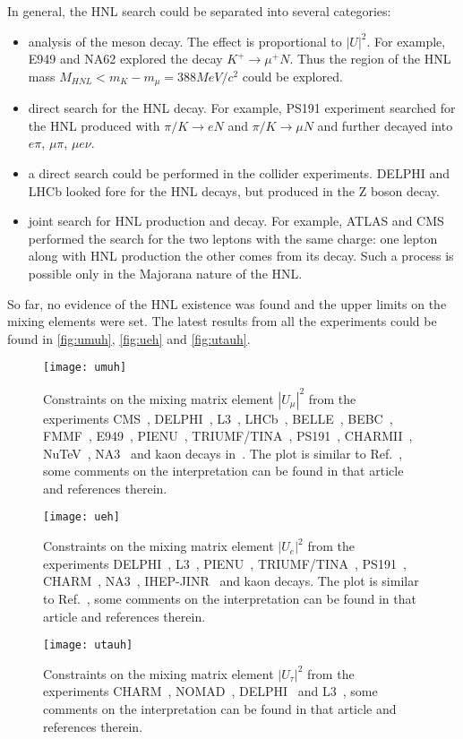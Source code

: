 \documentclass[../main.tex]{subfiles}
\begin{document}
In general, the HNL search could be separated into several categories:
\begin{itemize}
  \item analysis of the meson decay. The effect is proportional to $\left|U\right|^2$. For example, E949 and NA62 explored the decay $K^+\to\mu^+N$. Thus the region of the HNL mass $M_{HNL} < m_K-m_\mu=388 MeV/c^2$ could be explored.
  \item direct search for the HNL decay. For example, PS191 experiment searched for the HNL produced with $\pi/K\to eN$ and $\pi/K\to\mu N$ and further decayed into $e\pi$, $\mu\pi$, $\mu e\nu$.
  \item a direct search could be performed in the collider experiments. DELPHI and LHCb looked fore for the HNL decays, but produced in the Z boson decay.
  \item joint search for HNL production and decay. For example, ATLAS and CMS performed the search for the two leptons with the same charge: one lepton along with HNL production the other comes from its decay. Such a process is possible only in the Majorana nature of the HNL.
\end{itemize}

So far, no evidence of the HNL existence was found and the upper limits on the mixing elements were set. The latest results from all the experiments could be found in \autoref{fig:umuh}, \autoref{fig:ueh} and \autoref{fig:utauh}.

\begin{figure}[!ht]
\centering
\texttt{[image: umuh]}
\caption{Constraints on the mixing matrix element $|U_{\mu}|^2$ from the experiments CMS~\cite{cms}, DELPHI~\cite{delphi}, L3~\cite{l3}, LHCb~\cite{lhcb}, BELLE~\cite{belle}, BEBC~\cite{bebc}, FMMF~\cite{fmmf}, E949~\cite{e949}, PIENU~\cite{pienu}, TRIUMF/TINA~\cite{triumf}, PS191~\cite{Bernardi1988}, CHARMII~\cite{charm2}, NuTeV~\cite{nutev}, NA3~\cite{na3} and kaon decays in~\cite{kaon2}. The plot is similar to Ref.~\cite{drewes}, some comments on the interpretation can be found in that article and references therein.}
\label{fig:umuh}
\end{figure}
\begin{figure}[!ht]
\centering
\texttt{[image: ueh]}
\caption{Constraints on the mixing matrix element $|U_{e}|^2$ from the experiments  DELPHI~\cite{delphi},  L3~\cite{l3}, PIENU~\cite{pienu}, TRIUMF/TINA~\cite{triumf}, PS191~\cite{Bernardi1988}, CHARM~\cite{charm}, NA3~\cite{na3}, IHEP-JINR~\cite{jinr} and kaon decays. The plot is similar to Ref.~\cite{drewes}, some comments on the interpretation can be found in that article and references therein.}
\label{fig:ueh}
\end{figure}
\begin{figure}[!ht]
\centering
\texttt{[image: utauh]}
\caption{Constraints on the mixing matrix element $|U_{\tau}|^2$ from the experiments  CHARM~\cite{orloff2002limits}, NOMAD~\cite{baldisseris2001search}, DELPHI~\cite{delphi} and L3~\cite{l3}, some comments on the interpretation can be found in that article and references therein.}
\label{fig:utauh}
\end{figure}
\end{document}
